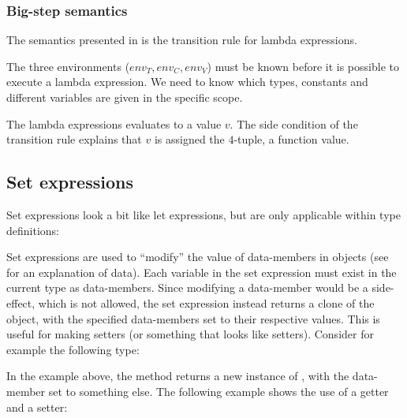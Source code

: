\subsubsection{Big-step semantics}

The semantics presented in  is the transition rule for
lambda expressions.



The three environments ($env_{T}, env_{C}, env_{V}$) must be known before it is
possible to execute a lambda expression. We need to know which types, constants
and different variables are given in the specific scope.

The lambda expressions evaluates to a value $v$. The side condition
of the transition rule explains that $v$ is assigned the $4$-tuple, a
function value.

\subsection{Set expressions}
\label{sec:setexpressions}

Set expressions look a bit like let expressions, but are only applicable within
type definitions:

\begin{ebnf}
\end{ebnf}

Set expressions are used to ``modify'' the value of data-members in objects (see
 for an explanation of data). Each variable in the
set expression must exist in the current type as data-members. Since modifying a
data-member would be a side-effect, which is not allowed, the set expression
instead returns a clone of the object, with the specified data-members set to
their respective values. This is useful for making setters (or something that
looks like setters). Consider for example the following type:


In the example above, the method  returns a new instance of
, with the data-member  set to something else. The
following example shows the use of a getter and a setter:


